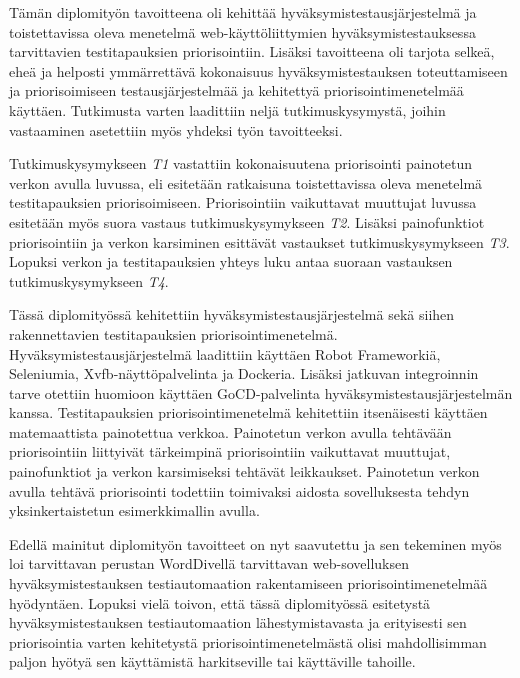 Tämän diplomityön tavoitteena oli kehittää hyväksymistestausjärjestelmä ja toistettavissa oleva menetelmä web-käyttöliittymien hyväksymistestauksessa tarvittavien testitapauksien priorisointiin.
Lisäksi tavoitteena oli tarjota selkeä, eheä ja helposti ymmärrettävä kokonaisuus hyväksymistestauksen toteuttamiseen ja priorisoimiseen testausjärjestelmää ja kehitettyä priorisointimenetelmää käyttäen.
Tutkimusta varten laadittiin neljä tutkimuskysymystä, joihin vastaaminen asetettiin myös yhdeksi työn tavoitteeksi.

Tutkimuskysymykseen \emph{T1} vastattiin kokonaisuutena priorisointi painotetun verkon avulla luvussa, eli esitetään ratkaisuna toistettavissa oleva menetelmä testitapauksien priorisoimiseen.
Priorisointiin vaikuttavat muuttujat luvussa esitetään myös suora vastaus tutkimuskysymykseen \emph{T2}.
Lisäksi painofunktiot priorisointiin ja verkon karsiminen esittävät vastaukset tutkimuskysymykseen \emph{T3}.
Lopuksi verkon ja testitapauksien yhteys luku antaa suoraan vastauksen tutkimuskysymykseen \emph{T4}.

Tässä diplomityössä kehitettiin hyväksymistestausjärjestelmä sekä siihen rakennettavien testitapauksien priorisointimenetelmä.
Hyväksymistestausjärjestelmä laadittiin käyttäen Robot Frameworkiä, Seleniumia, Xvfb-näyttöpalvelinta ja Dockeria.
Lisäksi jatkuvan integroinnin tarve otettiin huomioon käyttäen GoCD-palvelinta hyväksymistestausjärjestelmän kanssa.
Testitapauksien priorisointimenetelmä kehitettiin itsenäisesti käyttäen matemaattista painotettua verkkoa.
Painotetun verkon avulla tehtävään priorisointiin liittyivät tärkeimpinä priorisointiin vaikuttavat muuttujat, painofunktiot ja verkon karsimiseksi tehtävät leikkaukset.
Painotetun verkon avulla tehtävä priorisointi todettiin toimivaksi aidosta sovelluksesta tehdyn yksinkertaistetun esimerkkimallin avulla.

Edellä mainitut diplomityön tavoitteet on nyt saavutettu ja sen tekeminen myös loi tarvittavan perustan WordDivellä tarvittavan web-sovelluksen hyväksymistestauksen testiautomaation rakentamiseen priorisointimenetelmää hyödyntäen.
Lopuksi vielä toivon, että tässä diplomityössä esitetystä hyväksymistestauksen testiautomaation lähestymistavasta ja erityisesti sen priorisointia varten kehitetystä priorisointimenetelmästä olisi mahdollisimman paljon hyötyä sen käyttämistä harkitseville tai käyttäville tahoille.